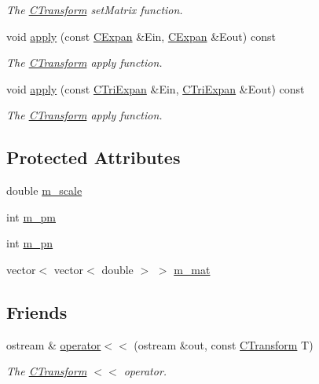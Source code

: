 \begin{DoxyCompactItemize}
\begin{DoxyCompactList}\small\item\em The \hyperlink{classCTransform}{C\-Transform} set\-Matrix function. \end{DoxyCompactList}\item 
void \hyperlink{classCTransform_a316b9e554734130d5154d19e38887cef}{apply} (const \hyperlink{classCExpan}{C\-Expan} \&Ein, \hyperlink{classCExpan}{C\-Expan} \&Eout) const 
\begin{DoxyCompactList}\small\item\em The \hyperlink{classCTransform}{C\-Transform} apply function. \end{DoxyCompactList}\item 
void \hyperlink{classCTransform_a986c0b58c44e47823f6811eeb4b5d096}{apply} (const \hyperlink{classCTriExpan}{C\-Tri\-Expan} \&Ein, \hyperlink{classCTriExpan}{C\-Tri\-Expan} \&Eout) const 
\begin{DoxyCompactList}\small\item\em The \hyperlink{classCTransform}{C\-Transform} apply function. \end{DoxyCompactList}\end{DoxyCompactItemize}
\subsection*{Protected Attributes}
\begin{DoxyCompactItemize}
\item 
double \hyperlink{classCTransform_a3acf3a68d49e7535a4dd40a8a754def1}{m\-\_\-scale}
\item 
int \hyperlink{classCTransform_ad94510961771c7528f770330f2e66ad2}{m\-\_\-pm}
\item 
int \hyperlink{classCTransform_aed813830606385011019c96b53cee18c}{m\-\_\-pn}
\item 
vector$<$ vector$<$ double $>$ $>$ \hyperlink{classCTransform_ac57b548a5882b9da492184c88dbe364c}{m\-\_\-mat}
\end{DoxyCompactItemize}
\subsection*{Friends}
\begin{DoxyCompactItemize}
\item 
ostream \& \hyperlink{classCTransform_a027f402dfdf090fb7f0620739b778622}{operator$<$$<$} (ostream \&out, const \hyperlink{classCTransform}{C\-Transform} T)
\begin{DoxyCompactList}\small\item\em The \hyperlink{classCTransform}{C\-Transform} $<$$<$ operator. \end{DoxyCompactList}\end{DoxyCompactItemize}


